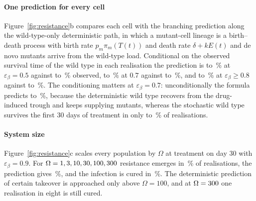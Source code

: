 \paragraph{One prediction for every cell}
Figure~\ref{fig:resistance}b compares each cell with the branching prediction along the wild-type-only deterministic path, in which a mutant-cell lineage is a birth--death process with birth rate $p_m \pi_m(T(t))$ and death rate $\delta + kE(t)$ and de novo mutants arrive from the wild-type load. Conditional on the observed survival time of the wild type in each realisation the prediction is \TheoryWeakCondMin{} to \TheoryWeakCondMax\,\% at $\varepsilon_\beta = 0.5$ against \EmergeWeakMin{} to \EmergeWeakMax\,\% observed, \TheoryMidCondMin{} to \TheoryMidCondMax\,\% at $0.7$ against \EmergeMidMin{} to \EmergeMidMax\,\%, and \TheorySuppressedCondMin{} to \TheorySuppressedCondMax\,\% at $\varepsilon_\beta \ge 0.8$ against \EmergeSuppressedMin{} to \EmergeSuppressedMax\,\%. The conditioning matters at $\varepsilon_\beta = 0.7$: unconditionally the formula predicts \TheoryMidMin{} to \TheoryMidMax\,\%, because the deterministic wild type recovers from the drug-induced trough and keeps supplying mutants, whereas the stochastic wild type survives the first 30 days of treatment in only \WtWindowMidMin{} to \WtWindowMidMax\,\% of realisations.

\paragraph{System size}
Figure~\ref{fig:resistance}c scales every population by $\Omega$ at treatment on day 30 with $\varepsilon_\beta = 0.9$. For $\Omega = 1, 3, 10, 30, 100, 300$ resistance emerges in \EmergeOmegaList\,\% of realisations, the prediction gives \TheoryOmegaList\,\%, and the infection is cured in \CureOmegaList\,\%. The deterministic prediction of certain takeover is approached only above $\Omega = 100$, and at $\Omega = 300$ one realisation in eight is still cured.

